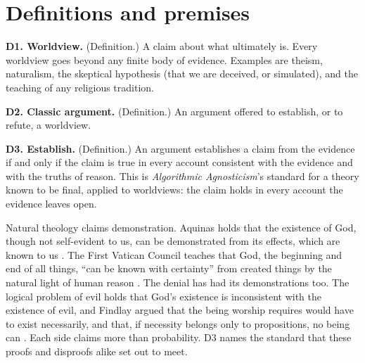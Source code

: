 \section{Definitions and premises}\label{sec:classification}

\medskip\noindent\textbf{D1. Worldview.}\label{item:D1}
(Definition.) A claim about what ultimately is. Every worldview goes beyond any finite body of
evidence. Examples are theism, naturalism, the skeptical hypothesis (that we are deceived, or
simulated), and the teaching of any religious tradition.

\medskip\noindent\textbf{D2. Classic argument.}\label{item:D2}
(Definition.) An argument offered to establish, or to refute, a worldview.

\medskip\noindent\textbf{D3. Establish.}\label{item:D3}
(Definition.) An argument establishes a claim from the evidence if and only if the claim is true in every
account consistent with the evidence and with the truths of reason. This is \emph{Algorithmic Agnosticism}'s
standard for a theory known to be final, applied to worldviews: the claim holds in every account the evidence leaves open.

Natural theology claims demonstration. Aquinas holds that the existence of God, though not
self-evident to us, can be demonstrated from its effects, which are known to us
\citep[I q.2 a.2]{aquinas-st}. The First Vatican Council teaches that God, the beginning and end of
all things, ``can be known with certainty'' from created things by the natural light of human
reason \citep[ch.~2]{vatican1870}. The denial has had its demonstrations too. The logical problem
of evil holds that God's existence is inconsistent with the existence of evil, and Findlay argued
that the being worship requires would have to exist necessarily, and that, if necessity belongs
only to propositions, no being can \citep{mackie1955,findlay1948}. Each side claims more than
probability. D3 names the standard that these proofs and disproofs alike set
out to meet.

